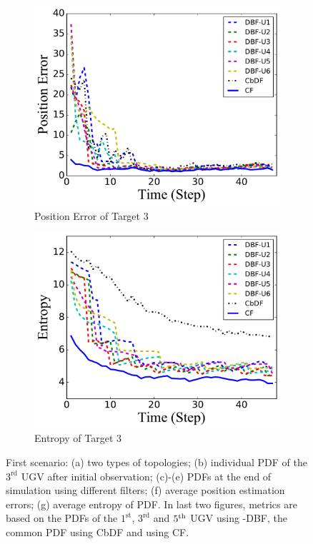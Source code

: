 \begin{figure}
		\begin{subfigure}[b]{0.23\textwidth}
			\includegraphics[width=\textwidth]{figures/hetero_mov_sen_mov_tar_pos_err_noise_sin}
			\caption{Position Error of Target $3$}\label{fig:sin_pos_err}
		\end{subfigure}
		\begin{subfigure}[b]{0.23\textwidth}
			\includegraphics[width=\textwidth]{figures/hetero_mov_sen_mov_tar_entropy_noise_sin}
			\caption{Entropy of Target $3$}\label{fig:sin_ent}
		\end{subfigure}		
		\caption{First scenario: (a) two types of topologies; (b) individual PDF of the $3^\text{rd}$ UGV after initial observation; (c)-(e) PDFs at the end of simulation using different filters; (f) average position estimation errors; (g) average entropy of PDF. In last two figures, metrics are based on the PDFs of the $1^\text{st}$, $3^\text{rd}$ and $5^\text{th}$ UGV using \proto-DBF, the common PDF using CbDF and using CF.}
		\label{fig:metrics}
	\end{figure}		